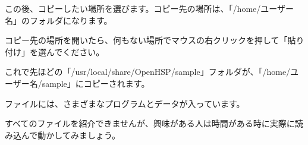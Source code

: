 この後、コピーしたい場所を選びます。コピー先の場所は、「/home/ユーザー名」のフォルダになります。

コピー先の場所を開いたら、何もない場所でマウスの右クリックを押して「貼り付け」を選んでください。

これで先ほどの「/usr/local/share/OpenHSP/sample」フォルダが、「/home/ユーザー名/sample」にコピーされます。

ファイルには、さまざまなプログラムとデータが入っています。

すべてのファイルを紹介できませんが、興味がある人は時間がある時に実際に読み込んで動かしてみましょう。



